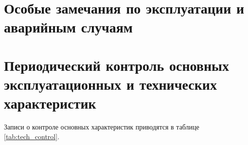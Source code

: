 	
\section{Особые замечания по эксплуатации и аварийным случаям}

	\noindent\underline{\hspace\textwidth}
	\noindent\underline{\hspace\textwidth}	
	\noindent\underline{\hspace\textwidth}
	\noindent\underline{\hspace\textwidth}
	\noindent\underline{\hspace\textwidth}
	\noindent\underline{\hspace\textwidth}	
	\noindent\underline{\hspace\textwidth}
	\noindent\underline{\hspace\textwidth}
	\noindent\underline{\hspace\textwidth}
	\noindent\underline{\hspace\textwidth}	
	\noindent\underline{\hspace\textwidth}
	\noindent\underline{\hspace\textwidth}
	\noindent\underline{\hspace\textwidth}
	\noindent\underline{\hspace\textwidth}	
	\noindent\underline{\hspace\textwidth}
	\noindent\underline{\hspace\textwidth}
	\noindent\underline{\hspace\textwidth}
	\noindent\underline{\hspace\textwidth}	
	\noindent\underline{\hspace\textwidth}
	\noindent\underline{\hspace\textwidth}			
	\newline
\newpage	


\section{Периодический контроль основных эксплуатационных и технических характеристик}
	
\paragraph{} Записи о контроле основных характеристик приводятся в таблице \ref{tab:tech_control}.

